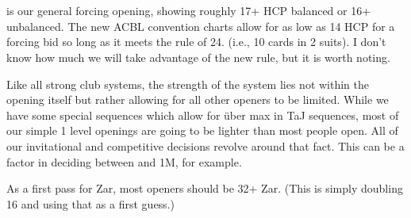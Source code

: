 \documentclass[tom-ari]{subfile}
\begin{document}
	
	\chapter[1C]{}
	
	 is our general forcing opening, showing roughly 17+ HCP balanced or 16+ unbalanced.  The new ACBL convention charts allow for as low as 14 HCP for a forcing bid so long as it meets the rule of 24.  (i.e., 10 cards in 2 suits).  I don't know how much we will take advantage of the new rule, but it is worth noting.
	
	Like all strong club systems, the strength of the system lies not within the  opening itself but rather allowing for all other openers to be limited.  While we have some special sequences which allow for \"{u}ber max in TaJ sequences, most of our simple 1 level openings are going to be lighter than most people open.  All of our invitational and competitive decisions revolve around that fact.  This can be a factor in deciding between  and 1M, for example.
	
	As a first pass for Zar, most  openers should be 32+ Zar.  (This is simply doubling 16 and using that as a first guess.)
	
	
	
\end{document}
